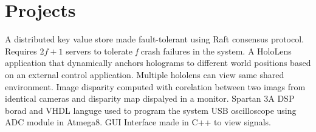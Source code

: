 \section{Projects}
  {A distributed key value store made fault-tolerant using Raft consensus protocol. Requires $2f+1$ servers to tolerate \textit{f} crash failures in the system.}
  {A HoloLens application that dynamically anchors holograms to different world positions based on an external control application. Multiple hololens can view same shared environment.}
  {Image disparity computed with corelation between two imags from identical cameras and disparity map dispalyed in a monitor. Spartan 3A DSP borad and VHDL languge used to program the system}
  {USB oscilloscope using ADC module in Atmega8. GUI Interface made in C++ to view signals.}
